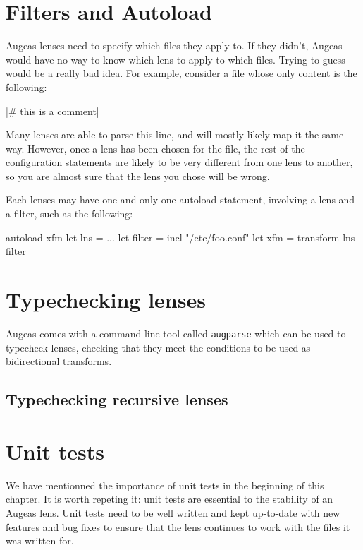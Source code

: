 \section{Filters and Autoload}

Augeas lenses need to specify which files they apply to. If they didn't, Augeas would have no way to know which lens to apply to which files. Trying to guess would be a really bad idea. For example, consider a file whose only content is the following:

\bashcode|# this is a comment|

Many lenses are able to parse this line, and will mostly likely map it the same way. However, once a lens has been chosen for the file, the rest of the configuration statements are likely to be very different from one lens to another, so you are almost sure that the lens you chose will be wrong.

Each lenses may have one and only one autoload statement, involving a lens and a filter, such as the following:

\begin{augeas}[]
autoload xfm
let lns = ...
let filter = incl "/etc/foo.conf"
let xfm = transform lns filter
\end{augeas}


\section{Typechecking lenses}

Augeas comes with a command line tool called \verb!augparse! which can be used to typecheck lenses, checking that they meet the conditions to be used as bidirectional transforms.

\subsection{Typechecking recursive lenses}

\section{Unit tests}

We have mentionned the importance of unit tests in the beginning of this chapter. It is worth repeting it: unit tests are essential to the stability of an Augeas lens. Unit tests need to be well written and kept up-to-date with new features and bug fixes to ensure that the lens continues to work with the files it was written for.

